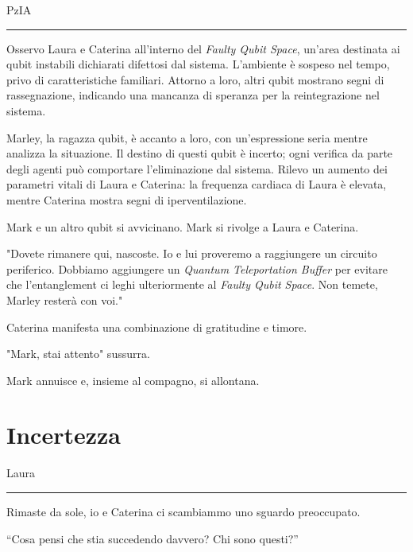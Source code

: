 \vspace{1em}
\begin{center}PzIA\end{center}
\hrule
\vspace{1em}
Osservo Laura e Caterina all'interno del \textit{Faulty Qubit Space}, un'area destinata ai qubit instabili dichiarati difettosi dal sistema. L'ambiente è sospeso nel tempo, privo di caratteristiche familiari. Attorno a loro, altri qubit mostrano segni di rassegnazione, indicando una mancanza di speranza per la reintegrazione nel sistema.

Marley, la ragazza qubit, è accanto a loro, con un'espressione seria mentre analizza la situazione. Il destino di questi qubit è incerto; ogni verifica da parte degli agenti può comportare l'eliminazione dal sistema. Rilevo un aumento dei parametri vitali di Laura e Caterina: la frequenza cardiaca di Laura è elevata, mentre Caterina mostra segni di iperventilazione.

Mark e un altro qubit si avvicinano. Mark si rivolge a Laura e Caterina.

\begin{dialogue}
 "Dovete rimanere qui, nascoste. Io e lui proveremo a raggiungere un circuito periferico. Dobbiamo aggiungere un \textit{Quantum Teleportation Buffer} per evitare che l'entanglement ci leghi ulteriormente al \textit{Faulty Qubit Space}. Non temete, Marley resterà con voi." 
\end{dialogue}

Caterina manifesta una combinazione di gratitudine e timore.
\begin{dialogue}
 "Mark, stai attento" sussurra.
\end{dialogue}
Mark annuisce e, insieme al compagno, si allontana.
\newpage
\section{Incertezza}
\vspace{1em}
\begin{center}Laura\end{center}
\hrule
\vspace{1em}
Rimaste da sole, io e Caterina ci scambiammo uno sguardo preoccupato. 

\begin{dialogue}
 \enquote{Cosa pensi che stia succedendo davvero? Chi sono questi?}
\end{dialogue}


